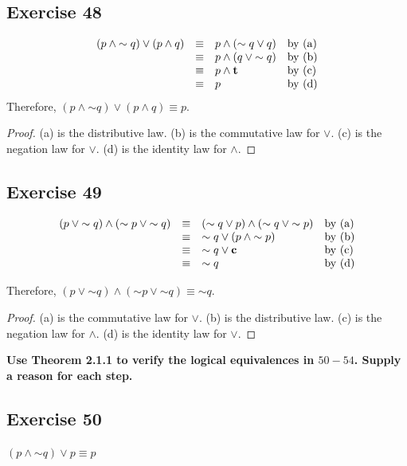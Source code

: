 \documentclass[14pt]{extarticle}
\newcommand{\true}{{\bf t}}
\newcommand{\false}{{\bf c}}
\begin{document}
\subsection{Exercise 48} 
$$ 
\begin{array}{rcll} 
(p \wedge {\sim q}) \vee (p \wedge q) & \equiv & p \wedge ({\sim q} \vee q) & \text{by (a)} \\ 
& \equiv & p \wedge (q \vee {\sim q}) & \text{by (b)} \\ 
& \equiv & p \wedge \true & \text{by (c)} \\ 
& \equiv & p & \text{by (d)} \\ 
\end{array} 
$$
Therefore, $(p \wedge {\sim q}) \vee (p \wedge q) \equiv p$.

\begin{proof} 
(a) is the distributive law. (b) is the commutative law for
$\vee$. (c) is the negation law for $\vee$. (d) is the identity law for $\wedge$. 
\end{proof}

\subsection{Exercise 49} 
$$ 
\begin{array}{rcll} 
(p \vee {\sim q}) \wedge ({\sim p} \vee {\sim q}) & \equiv & ({\sim q} \vee p) \wedge ({\sim q} \vee {\sim p}) & \text{by (a)} \\ 
& \equiv & {\sim q} \vee (p \wedge {\sim p}) & \text{by (b)} \\
& \equiv & {\sim q} \vee \false & \text{by (c)} \\ 
& \equiv & {\sim q} & \text{by (d)} \\ 
\end{array} 
$$

Therefore, $(p \vee {\sim q}) \wedge ({\sim p} \vee {\sim q}) \equiv {\sim q}$.

\begin{proof} 
(a) is the commutative law for $\vee$. (b) is the distributive
law. (c) is the negation law for $\wedge$. (d) is the identity law for $\vee$.
\end{proof}

{\bf Use Theorem 2.1.1 to verify the logical equivalences in $50-54$. Supply a reason for each step.}

\subsection{Exercise 50} 
$(p \wedge {\sim q}) \vee p \equiv p$
\end{document}
